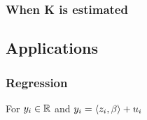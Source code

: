 \subsubsection{When K is estimated}
\subsection{Applications}
\subsubsection{Regression}
For $y_i\in \mathbb{R}$ and $y_i=\left\langle z_i,\beta\right\rangle+u_i$
